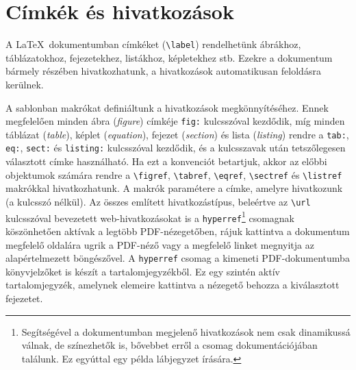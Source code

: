\section{Címkék és hivatkozások}
A \LaTeX~dokumentumban címkéket (\verb+\label+) rendelhetünk ábrákhoz, táblázatokhoz, fejezetekhez, listákhoz, képletekhez stb. Ezekre a dokumentum bármely részében hivatkozhatunk, a hivatkozások automatikusan feloldásra kerülnek.

A sablonban makrókat definiáltunk a hivatkozások megkönnyítéséhez. Ennek megfelelően minden ábra (\emph{figure}) címkéje \verb+fig:+ kulcsszóval kezdődik, míg minden táblázat (\emph{table}), képlet (\emph{equation}), fejezet (\emph{section}) és lista (\emph{listing}) rendre a \verb+tab:+, \verb+eq:+, \verb+sect:+ és \verb+listing:+ kulcsszóval kezdődik, és a kulcsszavak után tetszőlegesen választott címke használható. Ha ezt a konvenciót betartjuk, akkor az előbbi objektumok számára rendre a \verb+\figref+, \verb+\tabref+, \verb+\eqref+, \verb+\sectref+ és \verb+\listref+ makrókkal hivatkozhatunk. A makrók paramétere a címke, amelyre hivatkozunk (a kulcsszó nélkül). Az összes említett hivatkozástípus, beleértve az \verb+\url+ kulcsszóval bevezetett web-hivatkozásokat is a  \verb+hyperref+\footnote{Segítségével a dokumentumban megjelenő hivatkozások nem csak dinamikussá válnak, de színezhetők is, bővebbet erről a csomag dokumentációjában találunk. Ez egyúttal egy példa lábjegyzet írására.} csomagnak köszönhetően aktívak a legtöbb PDF-nézegetőben, rájuk kattintva a dokumentum megfelelő oldalára ugrik a PDF-néző vagy a megfelelő linket megnyitja az alapértelmezett böngészővel. A \verb+hyperref+ csomag a kimeneti PDF-dokumentumba könyvjelzőket is készít a tartalomjegyzékből. Ez egy szintén aktív tartalomjegyzék, amelynek elemeire kattintva a nézegető behozza a kiválasztott fejezetet.
